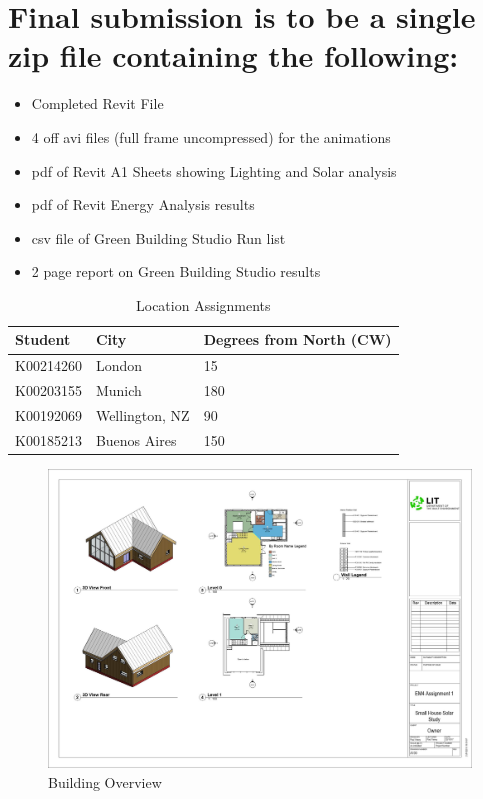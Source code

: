 \section*{Final submission is to be a single zip file containing the following:}



\begin{itemize}
	\item Completed Revit File
	\item 4 off avi files (full frame uncompressed) for the animations
	\item pdf of Revit A1 Sheets showing Lighting and Solar analysis
	\item pdf of Revit Energy Analysis results
	\item csv file of Green Building Studio Run list
	\item 2 page report on Green Building Studio results
\end{itemize}

\begin{table}
	
\begin{tabularx}{\textwidth}{ |X|X|X| }
	\hline
	\textbf{Student} & \textbf{City} & \textbf{Degrees from North (CW)} \\
	\hline 
	K00214260  & London & 15\degree \\
	K00203155  & Munich & 180\degree \\
	K00192069  & Wellington, NZ & 90\degree \\
	K00185213  & Buenos Aires & 150\degree \\
	\hline
\end{tabularx}
	\caption{Location Assignments}
\end{table}

\begin{figure}
	\centering
	\includegraphics[width=1.0\linewidth]{"RevitFiles/Assignment1 - Sheet - A100 - Small House Solar Study"}
	\caption{Building Overview}
	\label{fig:a100}
\end{figure}


